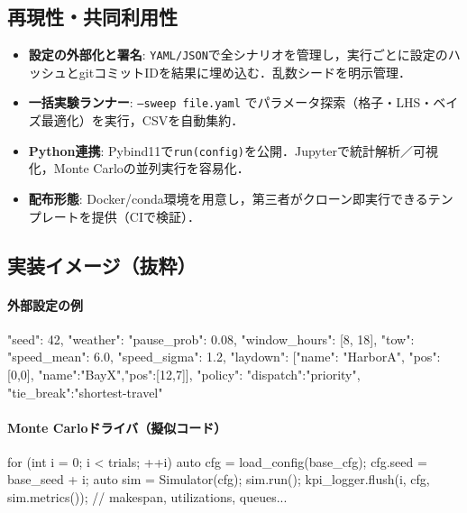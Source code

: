 \documentclass[10pt,letterpaper]{jsarticle}
\begin{document}
\subsection{再現性・共同利用性}
\begin{itemize}
\item \textbf{設定の外部化と署名}: \texttt{YAML/JSON}で全シナリオを管理し，実行ごとに設定のハッシュとgitコミットIDを結果に埋め込む．乱数シードを明示管理．
\item \textbf{一括実験ランナー}: \texttt{--sweep file.yaml} でパラメータ探索（格子・LHS・ベイズ最適化）を実行，CSVを自動集約．
\item \textbf{Python連携}: Pybind11で\texttt{run(config)}を公開．Jupyterで統計解析／可視化，Monte Carloの並列実行を容易化．
\item \textbf{配布形態}: Docker/conda環境を用意し，第三者がクローン即実行できるテンプレートを提供（CIで検証）．
\end{itemize}

\subsection{実装イメージ（抜粋）}
\paragraph{外部設定の例}
\begin{jsoncode}
{
"seed": 42,
"weather": {"pause_prob": 0.08, "window_hours": [8, 18]},
"tow": {"speed_mean": 6.0, "speed_sigma": 1.2},
"laydown": [{"name": "HarborA", "pos":[0,0]}, {"name":"BayX","pos":[12,7]}],
"policy": {"dispatch":"priority", "tie_break":"shortest-travel"}
}
\end{jsoncode}

\paragraph{Monte Carloドライバ（擬似コード）}
\begin{cppcode}
for (int i = 0; i < trials; ++i) {
auto cfg = load_config(base_cfg);
cfg.seed = base_seed + i;
auto sim = Simulator(cfg);
sim.run();
kpi_logger.flush(i, cfg, sim.metrics()); // makespan, utilizations, queues...
}
\end{cppcode}
\end{document}
